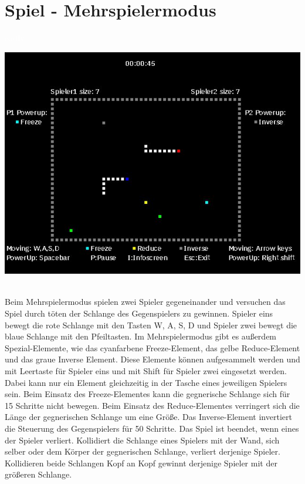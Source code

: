 \newpage
\section{Spiel - Mehrspielermodus}
\label{Spiel_-_Mehrspielermodus}
%
\textcolor{white}{easily}
\newline 
\begin{minipage}[X]{1.0\textwidth}
 \centering
 \includegraphics[scale=0.5]{bilder/Mehrspielermodus}
 \label{fig:mehrspielermodus}
\end{minipage}
\\
	Beim Mehrspielermodus spielen zwei Spieler gegeneinander und versuchen das Spiel durch t{\"o}ten der Schlange des Gegenspielers zu gewinnen. Spieler eins bewegt die rote Schlange mit den Tasten \glqq W\grqq{}, \glqq  A\grqq{}, \glqq S\grqq{}, \glqq D\grqq{} und Spieler zwei bewegt die blaue Schlange mit den Pfeiltasten. Im Mehrspielermodus gibt es au{\ss}erdem Spezial-Elemente, wie das cyanfarbene Freeze-Element, das gelbe Reduce-Element und das graue Inverse Element. Diese Elemente k{\"o}nnen aufgesammelt werden und mit Leertaste f{\"u}r Spieler eins und mit Shift f{\"u}r Spieler zwei eingesetzt werden. Dabei kann nur ein Element gleichzeitig in der Tasche eines jeweiligen Spielers sein. Beim Einsatz des Freeze-Elementes kann die gegnerische Schlange sich f{\"u}r 15 Schritte nicht bewegen. Beim Einsatz des Reduce-Elementes verringert sich die L{\"a}nge der gegnerischen Schlange um eine Gr{\"o}{\ss}e. Das Inverse-Element invertiert die Steuerung des Gegenspielers f{\"u}r 50 Schritte. Das Spiel ist beendet, wenn eines der Spieler verliert. Kollidiert die Schlange eines Spielers mit der Wand, sich selber oder dem K{\"o}rper der gegnerischen Schlange, verliert derjenige Spieler. Kollidieren beide Schlangen Kopf an Kopf gewinnt derjenige Spieler mit der gr{\"o}{\ss}eren Schlange.  

